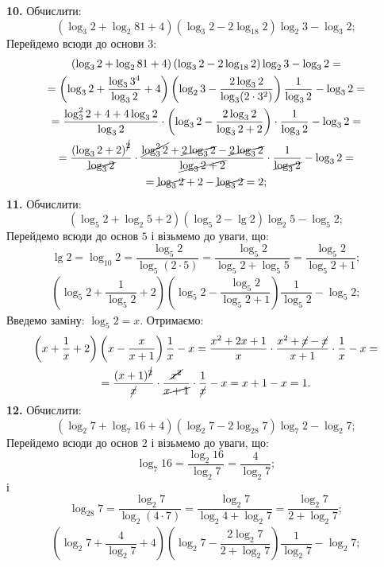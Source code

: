 \textbf{10.} Обчислити:
$$
\left(\log_3 2 + \log_2 81 + 4\right)\left(\log_3 2 - 2\log_{18} 2\right)\log_2 3 - \log_3 2;
$$
Перейдемо всюди до основи $3$:
\begin{multline*}
\left(\log_3 2 + \log_2 81 + 4\right)\left(\log_3 2 - 2\log_{18} 2\right)\log_2 3 - \log_3 2 =\\
= \left(\log_3 2 + \frac{\log_3 3^4}{\log_3 2} + 4\right)\left(\log_2 3 - \frac{2\log_3 2}{\log_3 (2 \cdot 3^2)}\right)\frac{1}{\log_3 2} - \log_3 2 =\\
= \frac{\log_3^2 2 + 4 + 4\log_3 2}{\log_3 2} \cdot \left(\log_3 2 - \frac{2\log_3 2}{\log_3 2 + 2}\right) \cdot \frac{1}{\log_3 2} - \log_3 2 =\\
= \frac{\left(\log_3 2 + 2\right)^{\cancel{2}}}{\cancel{\log_3 2}} \cdot \frac{\cancel{\log_3^2 2} + \cancel{2\log_3 2} - \cancel{2\log_3 2}}{\cancel{\log_3 2 + 2}} \cdot \frac{1}{\cancel{\log_3 2}} - \log_3 2 =\\
= \cancel{\log_3 2} + 2 - \cancel{\log_3 2} = 2;
\end{multline*}
\textbf{11.} Обчислити:
$$
\left(\log_{5}2+\log_{2}5+2\right)\left(\log_{5}2-\lg2\right)\log_{2}5-\log_{5}2;
$$
Перейдемо всюди до основ $5$ і візьмемо до уваги, що:
$$
\lg2=\log_{10}2=\dfrac{\log_{5}2}{\log_{5}(2\cdot5)}=
\dfrac{\log_{5}2}{\log_{5}2+\log_{5}5}=
\dfrac{\log_{5}2}{\log_{5}2+1};
$$
\begin{gather*}
\left(\log_{5}2+\dfrac{1}{\log_{5}2}+2\right)\left(\log_{5}2-\dfrac{\log_{5}2}{\log_{5}2+1}\right)\dfrac{1}{\log_{5}2}-\log_{5}2;
\end{gather*}
Введемо заміну: $\log_{5}2=x$. Отримаємо:
\begin{multline*}
\left(x+\dfrac{1}{x}+2\right)\left(x-\dfrac{x}{x+1}\right)\dfrac{1}{x}-x=
\dfrac{x^2+2x+1}{x}\cdot\dfrac{x^2+\cancel{x}-\cancel{x}}{x+1}\cdot\dfrac{1}{x}-x=\\
=\dfrac{(x+1)^{\cancel{2}}}{\cancel{x}}\cdot\dfrac{\cancel{x^2}}{\cancel{x+1}}\cdot\dfrac{1}{\cancel{x}}-x=
x+1-x=1.
\end{multline*}
\textbf{12.} Обчислити:
$$
\left(\log_{2}7+\log_{7}16+4\right)\left(\log_{2}7-2\log_{28}7\right)\log_{7}2-\log_{2}7;
$$
Перейдемо всюди до основ $2$ і візьмемо до уваги, що:
$$
\log_{7}16=\dfrac{\log_{2}16}{\log_{2}7}=\dfrac{4}{\log_{2}7};
$$
і
$$
\log_{28}7=\dfrac{\log_{2}7}{\log_{2}(4\cdot7)}=
\dfrac{\log_{2}7}{\log_{2}4+\log_{2}7}=
\dfrac{\log_{2}7}{2+\log_{2}7};
$$
\begin{gather*}
\left(\log_{2}7+\dfrac{4}{\log_{2}7}+4\right)\left(\log_{2}7-\dfrac{2\log_{2}7}{2+\log_{2}7}\right)\dfrac{1}{\log_{2}7}-\log_{2}7;
\end{gather*}
